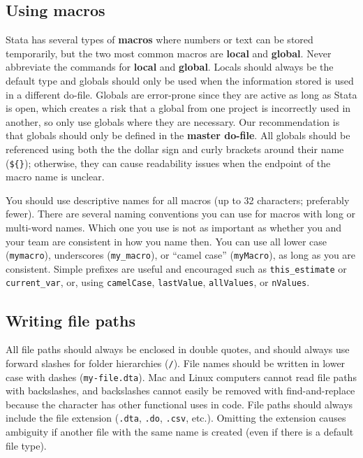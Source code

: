 \subsection{Using macros}

Stata has several types of \textbf{macros} where numbers or text can be stored temporarily,
but the two most common macros are \textbf{local} and \textbf{global}.
Never abbreviate the commands for \textbf{local} and \textbf{global}.
Locals should always be the default type and globals should only
be used when the information stored is used in a different do-file.
Globals are error-prone since they are active as long as Stata is open,
which creates a risk that a global from one project is incorrectly used in another,
so only use globals where they are necessary.
Our recommendation is that globals should only be defined in the \textbf{master do-file}.
All globals should be referenced using both the the dollar sign and curly brackets around their name (\texttt{\$\{\}});
otherwise, they can cause readability issues when the endpoint of the macro name is unclear.

You should use descriptive names for all macros (up to 32 characters; preferably fewer).
There are several naming conventions you can use for macros with long or multi-word names.
Which one you use is not as important as whether you and your team are consistent in how you name then.
You can use all lower case (\texttt{mymacro}), underscores (\texttt{my\_macro}),
or ``camel case'' (\texttt{myMacro}), as long as you are consistent.
Simple prefixes are useful and encouraged such as \texttt{this\_estimate} or \texttt{current\_var},
or, using \texttt{camelCase}, \texttt{lastValue}, \texttt{allValues}, or \texttt{nValues}.


\subsection{Writing file paths}

All file paths should always be enclosed in double quotes,
and should always use forward slashes for folder hierarchies (\texttt{/}).
File names should be written in lower case with dashes (\texttt{my-file.dta}).
Mac and Linux computers cannot read file paths with backslashes,
and backslashes cannot easily be removed with find-and-replace
because the character has other functional uses in code.
File paths should always include the file extension
(\texttt{.dta}, \texttt{.do}, \texttt{.csv}, etc.).
Omitting the extension causes ambiguity
if another file with the same name is created
(even if there is a default file type).

